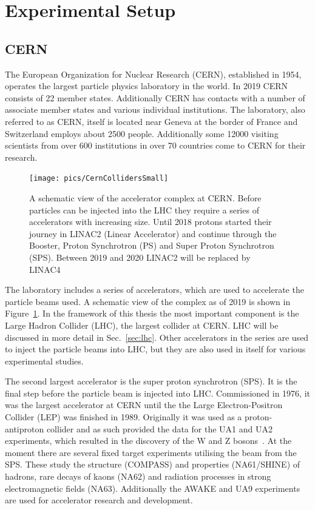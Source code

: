 
\section{Experimental Setup}
\label{sec:exp}
\subsection{CERN}
The European Organization for Nuclear Research (CERN), established in 1954, operates the largest particle physics laboratory in the world. In 2019 CERN consists of 22 member states. Additionally CERN has contacts with a number of associate member states and various individual institutions. The laboratory, also referred to as CERN, itself is located near Geneva at the border of France and Switzerland employs about 2500 people. Additionally some 12000 visiting scientists from over 600 institutions in over 70 countries come to CERN for their research. 

\begin{figure}[htb]
\centering
\texttt{[image: pics/CernCollidersSmall]}
\caption[CERN collider complex]{ A schematic view of the accelerator complex at CERN. Before particles can be injected into the LHC they require a series of accelerators with increasing size. Until 2018 protons started their journey in LINAC2 (Linear Accelerator) and continue through the Booster, Proton Synchrotron (PS) and Super Proton Synchrotron (SPS). Between 2019 and 2020 LINAC2 will be replaced by LINAC4~\cite{CernComplex}}
\label{fig:CernComplex}
\end{figure}

The laboratory includes a series of accelerators, which are used to accelerate the particle beams used. A schematic view of the complex as of 2019 is shown in Figure~\ref{fig:CernComplex}. In the framework of this thesis the most important component is the Large Hadron Collider (LHC), the largest collider at CERN. LHC will be discussed in more detail in Sec.~\ref{sec:lhc}. Other accelerators in the series are used to inject the particle beams into LHC, but they are also used in itself for various experimental studies. 

The second largest accelerator is the super proton synchrotron (SPS). It is the final step before the particle beam is injected into LHC. Commissioned in 1976, it was the largest accelerator at CERN until the the Large Electron-Positron Collider (LEP) was finished in 1989. Originally it was used as a proton-antiproton collider and as such provided the data for the UA1 and UA2 experiments, which resulted in the discovery of the W and Z bosons~\cite{Watkins:1986va}. At the moment there are several fixed target experiments utilising the beam from the SPS. These study the structure (COMPASS) and properties (NA61/SHINE) of hadrons, rare decays of kaons (NA62) and radiation processes in strong electromagnetic fields (NA63). Additionally the AWAKE and UA9 experiments are used for accelerator research and development. 

